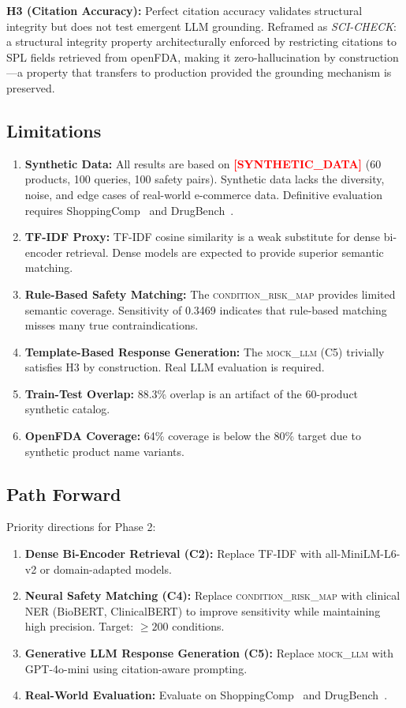 \documentclass[conference]{IEEEtran}
\newcommand{\synflag}{\textcolor{red}{\textbf{[SYNTHETIC\_DATA]}}}
\begin{document}
\textbf{H3 (Citation Accuracy):} Perfect citation accuracy validates structural
integrity but does not test emergent LLM grounding. Reframed as \textit{SCI-CHECK}:
a structural integrity property architecturally enforced by restricting citations
to SPL fields retrieved from openFDA, making it zero-hallucination by
construction---a property that transfers to production provided the grounding
mechanism is preserved.

\subsection{Limitations}

\begin{enumerate}
  \item \textbf{Synthetic Data:} All results are based on \synflag{} (60
    products, 100 queries, 100 safety pairs). Synthetic data lacks the diversity,
    noise, and edge cases of real-world e-commerce data. Definitive evaluation
    requires ShoppingComp~\cite{shoppingcomp} and DrugBench~\cite{drugbench}.
  \item \textbf{TF-IDF Proxy:} TF-IDF cosine similarity is a weak substitute for
    dense bi-encoder retrieval. Dense models are expected to provide superior
    semantic matching.
  \item \textbf{Rule-Based Safety Matching:} The \textsc{condition\_risk\_map}
    provides limited semantic coverage. Sensitivity of 0.3469 indicates that
    rule-based matching misses many true contraindications.
  \item \textbf{Template-Based Response Generation:} The \textsc{mock\_llm}
    (C5) trivially satisfies H3 by construction. Real LLM evaluation is required.
  \item \textbf{Train-Test Overlap:} 88.3\% overlap is an artifact of the
    60-product synthetic catalog.
  \item \textbf{OpenFDA Coverage:} 64\% coverage is below the 80\% target due to
    synthetic product name variants.
\end{enumerate}

\subsection{Path Forward}

Priority directions for Phase 2:
\begin{enumerate}
  \item \textbf{Dense Bi-Encoder Retrieval (C2):} Replace TF-IDF with
    all-MiniLM-L6-v2 or domain-adapted models.
  \item \textbf{Neural Safety Matching (C4):} Replace
    \textsc{condition\_risk\_map} with clinical NER (BioBERT, ClinicalBERT)
    to improve sensitivity while maintaining high precision. Target:
    $\geq 200$ conditions.
  \item \textbf{Generative LLM Response Generation (C5):} Replace
    \textsc{mock\_llm} with GPT-4o-mini using citation-aware prompting.
  \item \textbf{Real-World Evaluation:} Evaluate on ShoppingComp~\cite{shoppingcomp}
    and DrugBench~\cite{drugbench}.
\end{enumerate}
\end{document}
